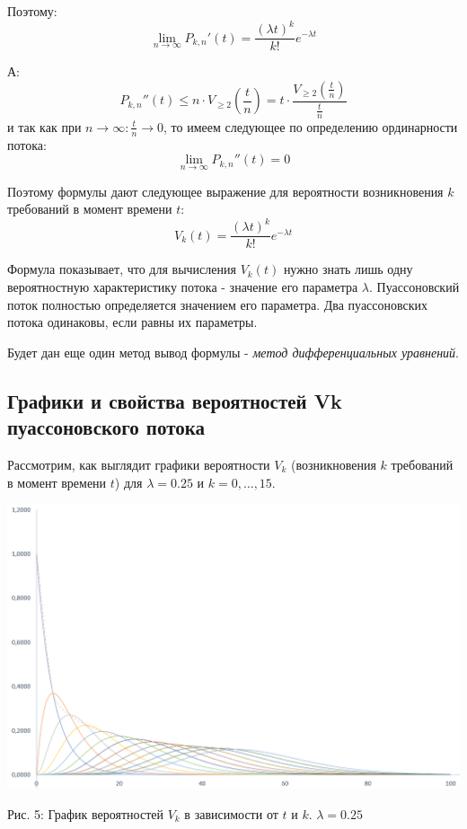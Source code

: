 \documentclass[aps,%
12pt,%
final,%
oneside,
onecolumn,%
musixtex, %
superscriptaddress,%
centertags]{article} %
\theoremstyle{plain}
\theoremstyle{definition}
\theoremstyle{remark}
\begin{document}
Поэтому:
$$\lim\limits_{n \to \infty} P_{k,n}'(t) =  \frac{(\lambda t)^k}{k!}e^{-\lambda t}$$

А:
$$P_{k,n}''(t) \leq n \cdot V_{\geq 2}\left(\frac{t}{n}\right) = t \cdot \frac{ V_{\geq 2}\left(\frac{t}{n}\right)}{\frac{t}{n}}$$
и так как при $n \to \infty : \frac{t}{n} \to 0$, то имеем следующее по определению ординарности потока:
$$\lim\limits_{n \to \infty} P_{k,n}''(t) = 0$$

Поэтому формулы дают следующее выражение для вероятности возникновения $k$ требований в момент времени $t$:
$$V_k(t) = \frac{(\lambda t)^k}{k!}e^{-\lambda t}$$

Формула показывает, что для вычисления $V_k(t)$ нужно знать лишь одну вероятностную характеристику потока - значение его параметра $\lambda$. Пуассоновский поток полностью определяется значением его параметра. Два пуассоновских потока одинаковы, если равны их параметры.

Будет дан еще один метод вывод формулы - \textit{метод дифференциальных уравнений}.

\newpage
\subsection{Графики и свойства вероятностей Vk пуассоновского потока}

Рассмотрим, как выглядит графики вероятности $V_k$ (возникновения $k$ требований в момент времени $t$) для $\lambda = 0.25$ и $k = 0,\ldots, 15$.

\begin{center}
  \includegraphics[scale=0.4]{images/6.png}

  Рис. 5: График вероятностей $V_k$ в зависимости от $t$ и $k$. $\lambda = 0.25$
\end{center}
\end{document}
